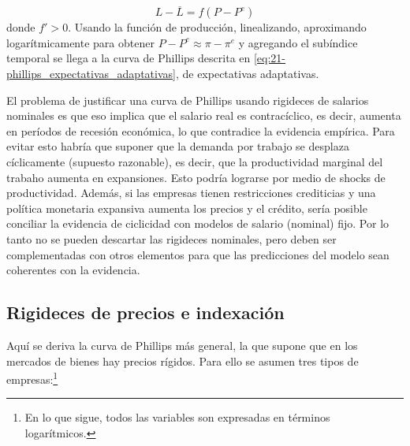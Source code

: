 \documentclass[DeGregorioResumen]{subfiles}
\begin{document}
\begin{equation}
	L-\overline L = f(P-P^e)
\end{equation}
donde $f'>0$. Usando la función de producción, linealizando, aproximando logarítmicamente para obtener $P-P^e \approx \pi-\pi^e$ y agregando el subíndice temporal se llega a la curva de Phillips descrita en \eqref{eq:21-phillips_expectativas_adaptativas}, de expectativas adaptativas.

El problema de justificar una curva de Phillips usando rigideces de salarios nominales es que eso implica que el salario real es contracíclico, es decir, aumenta en períodos de recesión económica, lo que contradice la evidencia empírica. Para evitar esto habría que suponer que la demanda por trabajo se desplaza cíclicamente (supuesto razonable), es decir, que la productividad marginal del trabaho aumenta en expansiones. Esto podría lograrse por medio de shocks de productividad. Además, si las empresas tienen restricciones crediticias y una política monetaria expansiva aumenta los precios y el crédito, sería posible conciliar la evidencia de ciclicidad con modelos de salario (nominal) fijo. Por lo tanto no se pueden descartar las rigideces nominales, pero deben ser complementadas con otros elementos para que las predicciones del modelo sean coherentes con la evidencia.

\subsection{Rigideces de precios e indexación}

Aquí se deriva la curva de Phillips más general, la que supone que en los mercados de bienes hay precios rígidos. Para ello se asumen tres tipos de empresas:\footnote{En lo que sigue, todos las variables son expresadas en términos logarítmicos.}
\end{document}
